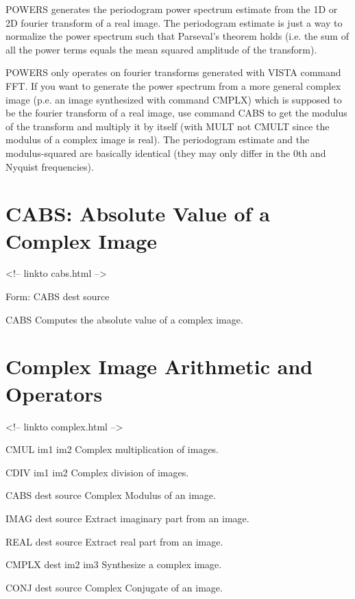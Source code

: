 POWERS generates the periodogram power spectrum estimate from the 1D or 2D
fourier transform of a real image. The periodogram estimate is just a way
to normalize the power spectrum such that Parseval's theorem holds
(i.e. the sum of all the power terms equals the mean squared amplitude of
the transform).

POWERS only operates on fourier transforms generated with VISTA command
FFT. If you want to generate the power spectrum from a more general
complex image (p.e. an image synthesized with command CMPLX) which is
supposed to be the fourier transform of a real image, use command CABS to
get the modulus of the transform and multiply it by itself (with MULT not
CMULT since the modulus of a complex image is real). The periodogram
estimate and the modulus-squared are basically identical (they may only
differ in the 0th and Nyquist frequencies).

\section{CABS: Absolute Value of a Complex Image}
\begin{rawhtml}
<!-- linkto cabs.html -->
\end{rawhtml}
\begin{command}
  \item[Form: CABS dest source\hfill]{}
\end{command}

CABS Computes the absolute value of a complex image.

\section{Complex Image Arithmetic and Operators}
\begin{rawhtml}
<!-- linkto complex.html -->
\end{rawhtml}
\begin{command}
  \item[CMUL im1 im2\hfill]{Complex multiplication of images.}
  \item[CDIV im1 im2\hfill]{Complex division of images.}
  \item[CABS dest source   \hfill]{Complex Modulus of an image.}
  \item[IMAG dest source   \hfill]{Extract imaginary part from an image.}
  \item[REAL dest source   \hfill]{Extract real part from an image.}
  \item[CMPLX dest im2 im3 \hfill]{Synthesize a complex image}.
  \item[CONJ dest source   \hfill]{Complex Conjugate of an image.}
\end{command}

